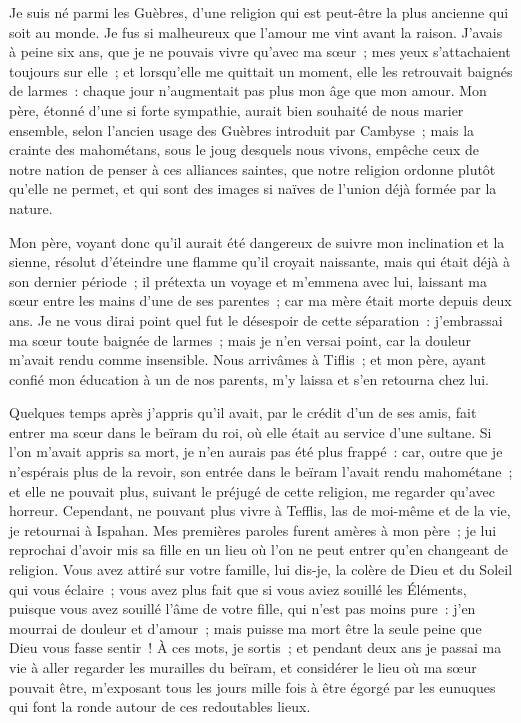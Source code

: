 \documentclass[french,twoside]{book} %
\begin{document}
\noindent Je suis né parmi les Guèbres, d’une religion qui est peut-être la plus ancienne qui soit au monde. Je fus si malheureux que l’amour me vint avant la raison. J’avais à peine six ans, que je ne pouvais vivre qu’avec ma sœur ; mes yeux s’attachaient toujours sur elle ; et lorsqu’elle me quittait un moment, elle les retrouvait baignés de larmes : chaque jour n’augmentait pas plus mon âge que mon amour. Mon père, étonné d’une si forte sympathie, aurait bien souhaité de nous marier ensemble, selon l’ancien usage des Guèbres introduit par Cambyse ; mais la crainte des mahométans, sous le joug desquels nous vivons, empêche ceux de notre nation de penser à ces alliances saintes, que notre religion ordonne plutôt qu’elle ne permet, et qui sont des images si naïves de l’union déjà formée par la nature.\par
Mon père, voyant donc qu’il aurait été dangereux de suivre mon inclination et la sienne, résolut d’éteindre une flamme qu’il croyait naissante, mais qui était déjà à son dernier période ; il prétexta un voyage et m’emmena avec lui, laissant ma sœur entre les mains d’une de ses parentes ; car ma mère était morte depuis deux ans. Je ne vous dirai point quel fut le désespoir de cette séparation : j’embrassai ma sœur toute baignée de larmes ; mais je n’en versai point, car la douleur m’avait rendu comme insensible. Nous arrivâmes à Tiflis ; et mon père, ayant confié mon éducation à un de nos parents, m’y laissa et s’en retourna chez lui.\par
Quelques temps après j’appris qu’il avait, par le crédit d’un de ses amis, fait entrer ma sœur dans le beïram du roi, où elle était au service d’une sultane. Si l’on m’avait appris sa mort, je n’en aurais pas été plus frappé : car, outre que je n’espérais plus de la revoir, son entrée dans le beïram l’avait rendu mahométane ; et elle ne pouvait plus, suivant le préjugé de cette religion, me regarder qu’avec horreur. Cependant, ne pouvant plus vivre à Tefflis, las de moi-même et de la vie, je retournai à Ispahan. Mes premières paroles furent amères à mon père ; je lui reprochai d’avoir mis sa fille en un lieu où l’on ne peut entrer qu’en changeant de religion. Vous avez attiré sur votre famille, lui dis-je, la colère de Dieu et du Soleil qui vous éclaire ; vous avez plus fait que si vous aviez souillé les Éléments, puisque vous avez souillé l’âme de votre fille, qui n’est pas moins pure : j’en mourrai de douleur et d’amour ; mais puisse ma mort être la seule peine que Dieu vous fasse sentir ! À ces mots, je sortis ; et pendant deux ans je passai ma vie à aller regarder les murailles du beïram, et considérer le lieu où ma sœur pouvait être, m’exposant tous les jours mille fois à être égorgé par les eunuques qui font la ronde autour de ces redoutables lieux.\par
\end{document}
